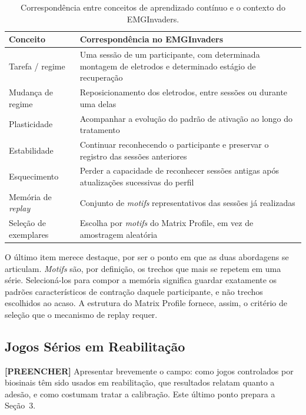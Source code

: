 \begin{table}[htb]
\centering
\caption{Correspondência entre conceitos de aprendizado contínuo e o
contexto do EMGInvaders.}
\label{tab:mapeamento}
\small
\begin{tabular}{@{}p{3.6cm}p{8.2cm}@{}}
\toprule
\textbf{Conceito} & \textbf{Correspondência no EMGInvaders} \\
\midrule
Tarefa / regime
& Uma sessão de um participante, com determinada montagem de eletrodos
e determinado estágio de recuperação \\
\addlinespace
Mudança de regime
& Reposicionamento dos eletrodos, entre sessões ou durante uma delas \\
\addlinespace
Plasticidade
& Acompanhar a evolução do padrão de ativação ao longo do tratamento \\
\addlinespace
Estabilidade
& Continuar reconhecendo o participante e preservar o registro das
sessões anteriores \\
\addlinespace
Esquecimento
& Perder a capacidade de reconhecer sessões antigas após atualizações
sucessivas do perfil \\
\addlinespace
Memória de \textit{replay}
& Conjunto de \textit{motifs} representativos das sessões já
realizadas \\
\addlinespace
Seleção de exemplares
& Escolha por \textit{motifs} do Matrix Profile, em vez de amostragem
aleatória \\
\bottomrule
\end{tabular}
\end{table}

O último item merece destaque, por ser o ponto em que as duas
abordagens se articulam. \textit{Motifs} são, por definição, os trechos
que mais se repetem em uma série. Selecioná-los para compor a memória
significa guardar exatamente os padrões característicos de contração
daquele participante, e não trechos escolhidos ao acaso. A estrutura do
Matrix Profile fornece, assim, o critério de seleção que o mecanismo de
replay requer.

\subsection{Jogos Sérios em Reabilitação}

\textbf{[PREENCHER]} Apresentar brevemente o campo: como jogos
controlados por biosinais têm sido usados em reabilitação, que
resultados relatam quanto a adesão, e como costumam tratar a
calibração. Este último ponto prepara a Seção~3.

